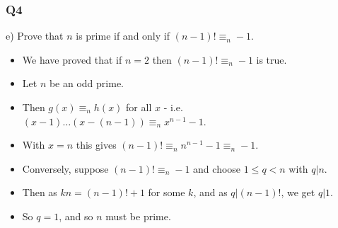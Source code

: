 \documentclass[handout]{beamer}
\begin{document}
\begin{frame}
\frametitle{Q4}
e) Prove that $n$ is prime if and only if $(n-1)! \equiv_n -1$.
\begin{itemize}
\item We have proved that if $n=2$ then $(n-1)! \equiv_n -1$ is true.
\item Let $n$ be an odd prime.
\item Then $g(x)\equiv_n h(x)$ for all $x$ - i.e. $(x-1)\ldots(x-(n-1)) \equiv_n x^{n-1}-1$.
\item With $x = n$ this gives $(n-1)! \equiv_n n^{n-1} -1 \equiv_n -1$.
\item Conversely, suppose $(n-1)! \equiv_n -1$ and choose $1\leq q < n$ with $q|n$.
\item Then as $kn = (n-1)! +1$ for some $k$, and as $q|(n-1)!$, we get $q|1$.
\item So $q=1$, and so $n$ must be prime.
\end{itemize}
\end{frame}
\end{document}
